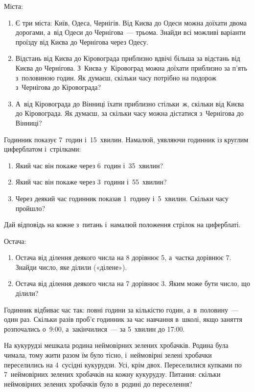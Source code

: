 \problem
Міста:
\begin{enumerate}
    \item Є три міста: Київ, Одеса, Чернігів.
    Від Києва до Одеси можна доїхати двома дорогами,
    а~від Одеси до Чернігова~--- трьома.
    Знайди всі можливі варіанти проїзду від Києва до Чернігова через Одесу.
    \item Відстань від Києва до Кіровограда приблизно вдвічі більша
    за відстань від Києва до Чернігова.
    З~Києва у~Кіровоград можна доїхати приблизно за п'ять з~половиною годин.
    Як думаєш, скільки часу потрібно на подорож з~Чернігова до Кіровограда?
    \item А~від Кіровограда до Вінниці їхати приблизно стільки~ж,
    скільки від Києва до Кіровограда.
    Як думаєш, за скільки часу можна дістатися з~Чернігова до Вінниці?
\end{enumerate}


\problem
Годинник показує 7~годин і~15~хвилин.
Намалюй, уявляючи годинник із круглим циферблатом і~стрілками:
\begin{enumerate}
    \item Який час він покаже через 6~годин і~35~хвилин?
    \item Який час він покаже через 3~години і~55~хвилин?
    \item Через деякий час годинник показав 1~годину і~5~хвилин.
    Скільки часу пройшло?
\end{enumerate}
Дай відповідь на кожне з~питань і~намалюй положення стрілок на циферблаті.


\problem
Остача:
\begin{enumerate}
    \item Остача від ділення деякого числа на 8 дорівнює 5,
    а~частка дорівнює 7.
    Знайди число, яке ділили («ділене»).
    \item Остача від ділення деякого числа на 7 дорівнює 3.
    Яким може бути число, що ділили?
\end{enumerate}


\problem
Годинник відбиває час так: повні години за кількістю годин,
а~в~половину~--- один раз.
Скільки разів проб’є годинник за час навчання в~школі,
якщо заняття розпочались о~9:00, а~закінчилися~--- за 5~хвилин до 17:00.


\problem
На кукурудзі мешкала родина неймовірних зелених хробачків.
Родина була чимала, тому жити разом їм було тісно, і~неймовірні
зелені хробачки переселились на 4~сусідні кукурудзи. Усі, крім двох.
Переселилися купками по 7~неймовірних зелених хробачків на кожну кукурудзу.
Питання: скільки неймовірних зелених хробачків було в~родині до переселення?


